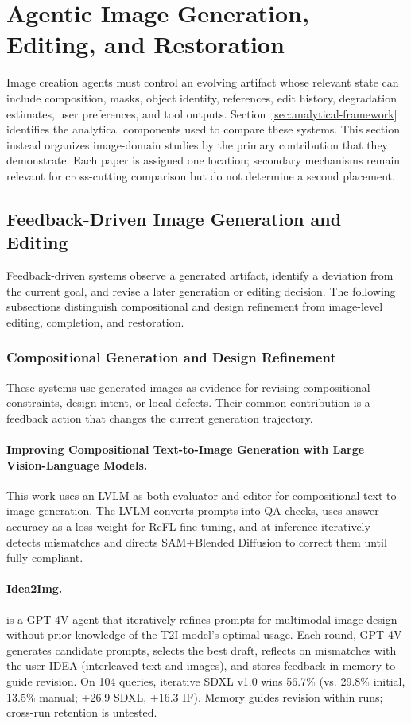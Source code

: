 ﻿\section{Agentic Image Generation, Editing, and Restoration}
\label{sec:image-generation}

Image creation agents must control an evolving artifact whose relevant state can include composition, masks, object identity, references, edit history, degradation estimates, user preferences, and tool outputs. Section~\ref{sec:analytical-framework} identifies the analytical components used to compare these systems. This section instead organizes image-domain studies by the primary contribution that they demonstrate. Each paper is assigned one location; secondary mechanisms remain relevant for cross-cutting comparison but do not determine a second placement.

\subsection{Feedback-Driven Image Generation and Editing}
Feedback-driven systems observe a generated artifact, identify a deviation from the current goal, and revise a later generation or editing decision. The following subsections distinguish compositional and design refinement from image-level editing, completion, and restoration.

\subsubsection{Compositional Generation and Design Refinement}
These systems use generated images as evidence for revising compositional constraints, design intent, or local defects. Their common contribution is a feedback action that changes the current generation trajectory.

\paragraph{Improving Compositional Text-to-Image Generation with Large Vision-Language Models.}
This work uses an LVLM as both evaluator and editor for compositional text-to-image generation. The LVLM converts prompts into QA checks, uses answer accuracy as a loss weight for ReFL fine-tuning, and at inference iteratively detects mismatches and directs SAM+Blended Diffusion to correct them until fully compliant. ~\cite{wen2023compositional}

\paragraph{Idea2Img.}
 is a GPT-4V agent that iteratively refines prompts for multimodal image design without prior knowledge of the T2I model's optimal usage. Each round, GPT-4V generates candidate prompts, selects the best draft, reflects on mismatches with the user IDEA (interleaved text and images), and stores feedback in memory to guide revision. On 104 queries, iterative SDXL v1.0 wins 56.7\% (vs. 29.8\% initial, 13.5\% manual; +26.9 SDXL, +16.3 IF). Memory guides revision within runs; cross-run retention is untested.~\cite{yang2024idea2img}

